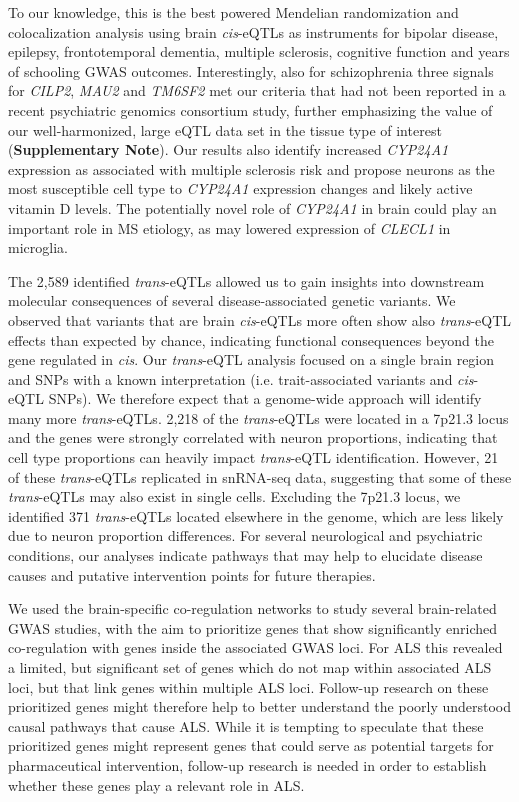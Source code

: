 To our knowledge, this is the best powered Mendelian randomization and colocalization analysis using brain \textit{cis}-eQTLs as instruments for bipolar disease, epilepsy, frontotemporal dementia, multiple sclerosis, cognitive function and years of schooling GWAS outcomes. Interestingly, also for schizophrenia three signals for \textit{CILP2}, \textit{MAU2} and \textit{TM6SF2} met our criteria that had not been reported in a recent psychiatric genomics consortium study\cite{consortiumMappingGenomicLoci2020}, further emphasizing the value of our well-harmonized, large eQTL data set in the tissue type of interest (\textbf{Supplementary Note}). Our results also identify increased \textit{CYP24A1} expression as associated with multiple sclerosis risk and propose neurons as the most susceptible cell type to \textit{CYP24A1} expression changes and likely active vitamin D levels. The potentially novel role of \textit{CYP24A1} in brain could play an important role in MS etiology, as may lowered expression of \textit{CLECL1} in microglia. 

The 2,589 identified \textit{trans}-eQTLs allowed us to gain insights into downstream molecular consequences of several disease-associated genetic variants. We observed that variants that are brain \textit{cis}-eQTLs more often show also \textit{trans}-eQTL effects than expected by chance, indicating functional consequences beyond the gene regulated in \textit{cis}. Our \textit{trans}-eQTL analysis focused on a single brain region and SNPs with a known interpretation (i.e. trait-associated variants and \textit{cis}-eQTL SNPs). We therefore expect that a genome-wide approach will identify many more \textit{trans}-eQTLs. 2,218 of the \textit{trans}-eQTLs were located in a 7p21.3 locus and the genes were strongly correlated with neuron proportions, indicating that cell type proportions can heavily impact \textit{trans}-eQTL identification. However, 21 of these \textit{trans}-eQTLs replicated in snRNA-seq data, suggesting that some of these \textit{trans}-eQTLs may also exist in single cells. Excluding the 7p21.3 locus, we identified 371 \textit{trans}-eQTLs located elsewhere in the genome, which are less likely due to neuron proportion differences. For several neurological and psychiatric conditions, our analyses indicate pathways that may help to elucidate disease causes and putative intervention points for future therapies.  

We used the brain-specific co-regulation networks to study several brain-related GWAS studies, with the aim to prioritize genes that show significantly enriched co-regulation with genes inside the associated GWAS loci. For ALS this revealed a limited, but significant set of genes which do not map within associated ALS loci, but that link genes within multiple ALS loci. Follow-up research on these prioritized genes might therefore help to better understand the poorly understood causal pathways that cause ALS. While it is tempting to speculate that these prioritized genes might represent genes that could serve as potential targets for pharmaceutical intervention, follow-up research is needed in order to establish whether these genes play a relevant role in ALS. 

